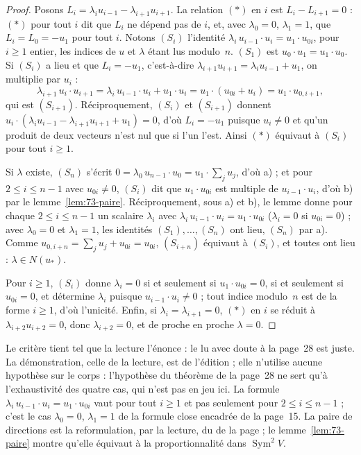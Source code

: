 \begin{proof}
Posons $L_i = \lambda_i u_{i-1} - \lambda_{i+1} u_{i+1}$. La relation $(\ast)$ en $i$ est $L_i - L_{i+1} = 0$ : $(\ast)$ pour tout $i$ dit que $L_i$ ne dépend pas de $i$, et, avec $\lambda_0 = 0$, $\lambda_1 = 1$, que $L_i = L_0 = -u_1$ pour tout $i$. Notons $(S_i)$ l'identité $\lambda_i\, u_{i-1} \cdot u_i = u_1 \cdot u_{0i}$, pour $i \geq 1$ entier, les indices de $u$ et $\lambda$ étant lus modulo~$n$. $(S_1)$ est $u_0 \cdot u_1 = u_1 \cdot u_0$. Si $(S_i)$ a lieu et que $L_i = -u_1$, c'est-à-dire $\lambda_{i+1} u_{i+1} = \lambda_i u_{i-1} + u_1$, on multiplie par $u_i$ :
\[ \lambda_{i+1}\, u_i \cdot u_{i+1} = \lambda_i\, u_{i-1} \cdot u_i + u_1 \cdot u_i = u_1 \cdot (u_{0i} + u_i) = u_1 \cdot u_{0,i+1}, \]
qui est $(S_{i+1})$. Réciproquement, $(S_i)$ et $(S_{i+1})$ donnent $u_i \cdot (\lambda_i u_{i-1} - \lambda_{i+1} u_{i+1} + u_1) = 0$, d'où $L_i = -u_1$ puisque $u_i \neq 0$ et qu'un produit de deux vecteurs n'est nul que si l'un l'est. Ainsi $(\ast)$ équivaut à $(S_i)$ pour tout $i \geq 1$.

Si $\lambda$ existe, $(S_n)$ s'écrit $0 = \lambda_0\, u_{n-1} \cdot u_0 = u_1 \cdot \sum_j u_j$, d'où a) ; et pour $2 \leq i \leq n - 1$ avec $u_{0i} \neq 0$, $(S_i)$ dit que $u_1 \cdot u_{0i}$ est multiple de $u_{i-1} \cdot u_i$, d'où b) par le lemme~\ref{lem:73-paire}. Réciproquement, sous a) et b), le lemme donne pour chaque $2 \leq i \leq n - 1$ un scalaire $\lambda_i$ avec $\lambda_i\, u_{i-1} \cdot u_i = u_1 \cdot u_{0i}$ ($\lambda_i = 0$ si $u_{0i} = 0$) ; avec $\lambda_0 = 0$ et $\lambda_1 = 1$, les identités $(S_1), \ldots, (S_n)$ ont lieu, $(S_n)$ par a). Comme $u_{0,i+n} = \sum_j u_j + u_{0i} = u_{0i}$, $(S_{i+n})$ équivaut à $(S_i)$, et toutes ont lieu : $\lambda \in N(u_*)$.

Pour $i \geq 1$, $(S_i)$ donne $\lambda_i = 0$ si et seulement si $u_1 \cdot u_{0i} = 0$, si et seulement si $u_{0i} = 0$, et détermine $\lambda_i$ puisque $u_{i-1} \cdot u_i \neq 0$ ; tout indice modulo~$n$ est de la forme $i \geq 1$, d'où l'unicité. Enfin, si $\lambda_i = \lambda_{i+1} = 0$, $(\ast)$ en $i$ se réduit à $\lambda_{i+2} u_{i+2} = 0$, donc $\lambda_{i+2} = 0$, et de proche en proche $\lambda = 0$.
\end{proof}

\begin{remarque}
Le critère tient tel que la lecture l'énonce : le  lu avec doute à la page~28 est juste. La démonstration, celle de la lecture, est de l'édition ; elle n'utilise aucune hypothèse sur le corps : l'hypothèse  du théorème de la page~28 ne sert qu'à l'exhaustivité des quatre cas, qui n'est pas en jeu ici. La formule $\lambda_i\, u_{i-1} \cdot u_i = u_1 \cdot u_{0i}$ vaut pour tout $i \geq 1$ et pas seulement pour $2 \leq i \leq n - 1$ ; c'est le cas $\lambda_0 = 0$, $\lambda_1 = 1$ de la formule close encadrée de la page~15. La paire de directions est la reformulation, par la lecture, du  de la page ; le lemme~\ref{lem:73-paire} montre qu'elle équivaut à la proportionnalité dans $\operatorname{Sym}^2 V$.
\end{remarque}


